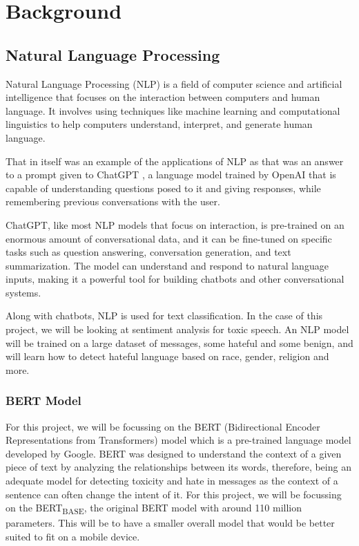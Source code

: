 \chapter{Background}

\section{Natural Language Processing}

Natural Language Processing (NLP) is a field of computer science and artificial intelligence that focuses on the interaction between computers and human language. It involves using techniques like machine learning and computational linguistics to help computers understand, interpret, and generate human language.

That in itself was an example of the applications of NLP as that was an answer to a prompt given to ChatGPT \cite{ChatGPT}, a language model trained by OpenAI that is capable of understanding questions posed to it and giving responses, while remembering previous conversations with the user. 

ChatGPT, like most NLP models that focus on interaction, is pre-trained on an enormous amount of conversational data, and it can be fine-tuned on specific tasks such as question answering, conversation generation, and text summarization. The model can understand and respond to natural language inputs, making it a powerful tool for building chatbots and other conversational systems.

Along with chatbots, NLP is used for text classification. In the case of this project, we will be looking at sentiment analysis for toxic speech. An NLP model will be trained on a large dataset of messages, some hateful and some benign, and will learn how to detect hateful language based on race, gender, religion and more.

\subsection{BERT Model}
\label{sec:BERT}
For this project, we will be focussing on the BERT (Bidirectional Encoder Representations from Transformers) \cite{BERT} model which is a pre-trained language model developed by Google. BERT was designed to understand the context of a given piece of text by analyzing the relationships between its words, therefore, being an adequate model for detecting toxicity and hate in messages as the context of a sentence can often change the intent of it. For this project, we will be focussing on the BERT\textsubscript{BASE}, the original BERT model with around 110 million parameters. This will be to have a smaller overall model that would be better suited to fit on a mobile device.

